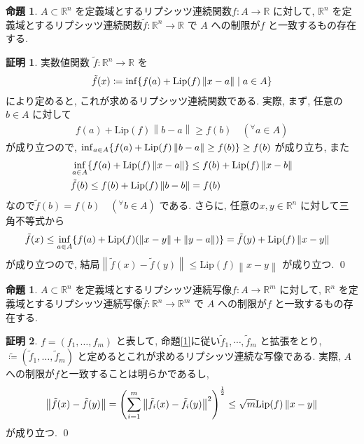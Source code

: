 \documentclass[twocolumn, landscape, a4paper , 8pt, fleqn, titlepage ]{jsarticle}
\theoremstyle{definition}
\newtheorem{prop}[dfn]{命題}
\newtheorem*{pf*}{証明}
\newcommand{\any}{{}^{\forall}}
\newcommand{\paren}[1]{\mleft( #1\mright )}
\newcommand{\cbra}[1]{\mleft\{#1\mright\}}
\newcommand{\norm}[1]{\left\|#1\right\|}
\newcommand{\Lip}[1]{\textrm{Lip}(#1)}
\renewcommand{\-}{\hyphen}
\begin{document}
\begin{prop}
$A \subset \mathbb R^n$ を定義域とするリプシッツ連続関数$f: A \rightarrow \mathbb R$ に対して, $\mathbb R^n$ を定義域とするリプシッツ連続関数$\tilde f : \mathbb R^n \rightarrow \mathbb R$ で $A$ への制限が$f$ と一致するもの存在する.
\end{prop}
\begin{pf*}
実数値関数 $\tilde f : \mathbb R^n \rightarrow \mathbb R$ を
\begin{align*} \tilde f (x) \coloneqq \inf \cbra{f(a) + \Lip f \norm{x-a} \mid a \in A }\end{align*}
により定めると, これが求めるリプシッツ連続関数である. 実際, まず, 任意の$b \in A$ に対して
\begin{align*} f(a) + \Lip f \norm{b-a} \geq f(b) \quad (\any a \in A) \end{align*}
が成り立つので, $\inf_{a \in A} \cbra{ f(a) + \Lip f \norm{b-a} \geq f(b) } \geq f(b)$ が成り立ち, また
\begin{align*} &\inf_{a \in A} \cbra{f(a) + \Lip f \norm{x-a} } \leq f(b) + \Lip f \norm{x-b} \\
&\tilde f (b) \leq f(b) + \Lip f \norm{b-b} = f(b)
\end{align*}
なので$\tilde f (b) = f(b) \quad (\any b \in A)$ である. さらに, 任意の$x, y \in \mathbb R^n$ に対して三角不等式から
\begin{align*} \tilde f(x) & \leq \inf_{a \in A} \cbra{f(a) + \Lip f \paren{\norm{x-y} + \norm{y-a}}} = \tilde f(y) + \Lip f \norm{x-y} \end{align*}
が成り立つので, 結局$\norm{\tilde f(x) - \tilde f(y)} \leq \Lip f \norm{x- y}$ が成り立つ. 
\qed
\end{pf*}


\begin{prop}
$A \subset \mathbb R^n$ を定義域とするリプシッツ連続写像$f: A \rightarrow \mathbb R ^m$ に対して, $\mathbb R^n$ を定義域とするリプシッツ連続写像$\tilde f : \mathbb R^n \rightarrow \mathbb R ^m$ で $A$ への制限が$f$ と一致するもの存在する.
\end{prop}
\begin{pf*}
$f = (f_1, \ldots , f_m)$ と表して, 命題\ref{1}に従い$\tilde f_1, \cdots , \tilde f_m$ と拡張をとり, $\tilde \coloneqq (\tilde f_1, \ldots , \tilde f_m)$ と定めるとこれが求めるリプシッツ連続な写像である. 実際, $A$ への制限が$f$と一致することは明らかであるし, 
\begin{align*} \norm{\tilde f(x) - \tilde f(y)} = \paren{\sum_{i=1}^m \norm{\tilde f _i (x) - \tilde f_i (y) }^2  }^{\frac{1}{2}} \leq \sqrt m \Lip f \norm{x-y} \end{align*}
が成り立つ.
\qed
\end{pf*}
\end{document}
